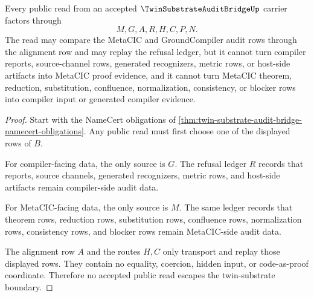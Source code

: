 \begin{theorem}
\label{thm:twin-substrate-audit-bridge-nonescape}
Every public read from an accepted $\TwinSubstrateAuditBridgeUp$ carrier factors through
$$
M,G,A,R,H,C,P,N.
$$
The read may compare the MetaCIC and GroundCompiler audit rows through the alignment row and may replay the refusal ledger, but it cannot turn compiler reports, source-channel rows, generated recognizers, metric rows, or host-side artifacts into MetaCIC proof evidence, and it cannot turn MetaCIC theorem, reduction, substitution, confluence, normalization, consistency, or blocker rows into compiler input or generated compiler evidence.
\end{theorem}
\begin{proof}
Start with the NameCert obligations of \autoref{thm:twin-substrate-audit-bridge-namecert-obligations}. Any public read must first choose one of the displayed rows of $B$.

For compiler-facing data, the only source is $G$. The refusal ledger $R$ records that reports, source channels, generated recognizers, metric rows, and host-side artifacts remain compiler-side audit data.

For MetaCIC-facing data, the only source is $M$. The same ledger records that theorem rows, reduction rows, substitution rows, confluence rows, normalization rows, consistency rows, and blocker rows remain MetaCIC-side audit data.

The alignment row $A$ and the routes $H,C$ only transport and replay those displayed rows. They contain no equality, coercion, hidden input, or code-as-proof coordinate. Therefore no accepted public read escapes the twin-substrate boundary.
\end{proof}

